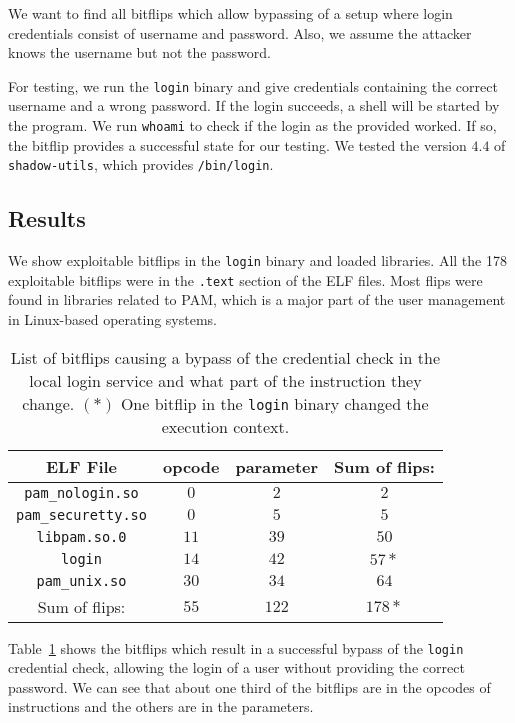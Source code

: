 We want to find all bitflips which allow bypassing of a setup where login
credentials consist of username and password. Also, we assume the attacker
knows the username but not the password.

For testing, we run the \texttt{login} binary and give credentials containing
the correct username and a wrong password. If the login succeeds, a shell will
be started by the program. We run \texttt{whoami} to check if the login as the
provided worked. If so, the bitflip provides a successful state for our
testing. We tested the version $4.4$ of \texttt{shadow-utils}, which provides
\texttt{/bin/login}.

\subsection{Results}

We show exploitable bitflips in the \texttt{login} binary and loaded libraries.
All the \num{178} exploitable bitflips were in the \texttt{.text} section of the
ELF files. Most flips were found in libraries related to PAM, which is a major
part of the user management in Linux-based operating systems.

\begin{table}[!htb]
\centering
\begin{tabular}{c|cc|c}
ELF File & opcode & parameter & Sum of flips:     \\ \hline
\texttt{pam\_nologin.so}   & $0$ & $2$  & $2$     \\
\texttt{pam\_securetty.so} & $0$ & $5$  & $5$     \\
\texttt{libpam.so.0}       & $11$ & $39$ & $50$   \\
\texttt{login}             & $14$ & $42$ & $57*$  \\
\texttt{pam\_unix.so}      & $30$ & $34$ & $64$ \\ \hline
Sum of flips:              & $55$ & $122$ & $178*$
\end{tabular}
\caption{List of bitflips causing a bypass of the credential check in the local
login service and what part of the instruction they change. $(*)$ One bitflip
in the \texttt{login} binary changed the execution context.}
\label{tab:loginres}
\end{table}

Table~\ref{tab:loginres} shows the bitflips which result in a successful bypass
of the \texttt{login} credential check, allowing the login of a user without
providing the correct password. We can see that about one third of the bitflips
are in the opcodes of instructions and the others are in the parameters.

